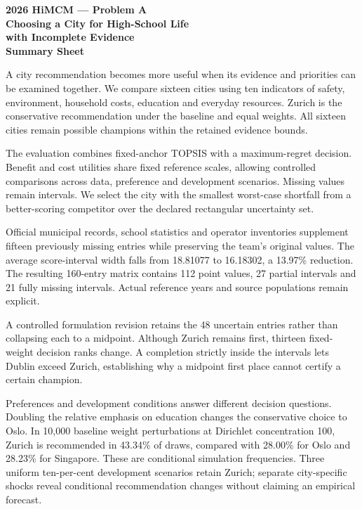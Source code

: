 \thispagestyle{fancy}
\begin{center}
\textbf{2026 HiMCM --- Problem A}\\[9pt]
{\Large\bfseries Choosing a City for High-School Life\\with Incomplete Evidence}\\[12pt]
\textbf{Summary Sheet}
\end{center}
A city recommendation becomes more useful when its evidence and priorities can
be examined together. We compare sixteen cities using ten indicators of safety,
environment, household costs, education and everyday resources. Zurich is the
conservative recommendation under the baseline and equal weights. All sixteen
cities remain possible champions within the retained evidence bounds.

The evaluation combines fixed-anchor TOPSIS with a maximum-regret decision.
Benefit and cost utilities share fixed reference scales, allowing controlled
comparisons across data, preference and development scenarios. Missing values
remain intervals. We select the city with the smallest worst-case shortfall from
a better-scoring competitor over the declared rectangular uncertainty set.

Official municipal records, school statistics and operator inventories supplement
fifteen previously missing entries while preserving the team's original values.
The average score-interval width falls from 18.81077 to 16.18302, a 13.97\%
reduction. The resulting 160-entry matrix contains 112 point values, 27 partial
intervals and 21 fully missing intervals. Actual reference years and source
populations remain explicit.

A controlled formulation revision retains the 48 uncertain entries rather
than collapsing each to a midpoint. Although Zurich remains first, thirteen
fixed-weight decision ranks change. A completion strictly inside the intervals
lets Dublin exceed Zurich, establishing why a midpoint first place cannot
certify a certain champion.

Preferences and development conditions answer different decision questions.
Doubling the relative emphasis on education changes the conservative choice to
Oslo. In 10,000 baseline weight perturbations at Dirichlet concentration 100,
Zurich is recommended in 43.34\% of draws, compared with 28.00\% for Oslo
and 28.23\% for Singapore. These are conditional simulation frequencies.
Three uniform ten-per-cent development scenarios retain Zurich; separate
city-specific shocks reveal conditional recommendation changes without claiming
an empirical forecast.

